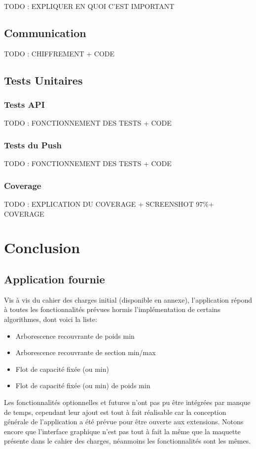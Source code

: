 \documentclass[french]{article}
\begin{document}
	TODO : EXPLIQUER EN QUOI C'EST IMPORTANT
	
	\subsection{Communication}
	
	TODO : CHIFFREMENT + CODE
	
	\subsection{Tests Unitaires}
	\subsubsection{Tests API}
	
	TODO : FONCTIONNEMENT DES TESTS + CODE
	
	\subsubsection{Tests du Push}
	
	TODO : FONCTIONNEMENT DES TESTS + CODE
	
	\subsubsection{Coverage}
	
	TODO : EXPLICATION DU COVERAGE + SCREENSHOT 97\%+ COVERAGE
	
		\section{Conclusion}
		
		\subsection{Application fournie}			
		Vis à vis du cahier des charges initial (disponible en annexe), l'application répond à toutes les fonctionnalités prévues hormis l'implémentation de certains algorithmes, dont voici la liste:
		\begin{itemize}
			\item Arborescence recouvrante de poids min
			\item Arborescence recouvrante de section min/max
			\item Flot de capacité fixée (ou min)
			\item Flot de capacité fixée (ou min) de poids min
		\end{itemize}
		Les fonctionnalités optionnelles et futures n'ont pas pu être intégrées par manque de temps, cependant leur ajout est tout à fait réalisable car la conception générale de l'application a été prévue pour être ouverte aux extensions. Notons encore que l'interface graphique n'est pas tout à fait la même que la maquette présente dans le cahier des charges, néanmoins les fonctionnalités sont les mêmes.\\
		
\end{document}
